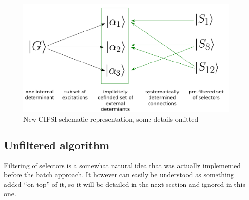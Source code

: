 \documentclass[./thesis.tex]{subfiles}
\begin{document}
\begin{figure}[h!]
	\begin{center}
		\includegraphics[width=0.7\columnwidth]{figures/cipsi/new_cipsi}
		\caption{New CIPSI schematic representation, some details omitted}
		\label{fig:new_cipsi}
	\end{center}
\end{figure}

\subsection{Unfiltered algorithm}

Filtering of selectors is a somewhat natural idea that was actually implemented before the batch approach. It however can easily be understood as something added ``on top'' of it, so it will be detailed in the next section and ignored in this one.
\end{document}
